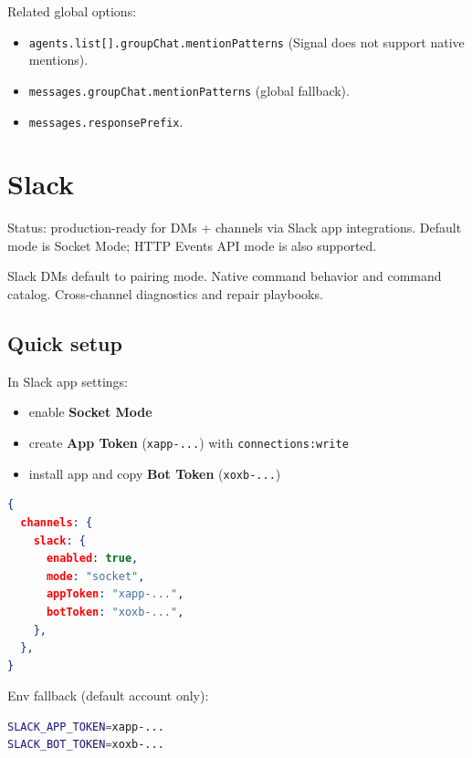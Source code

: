 Related global options:

\begin{itemize}
  \item \texttt{agents.list[].groupChat.mentionPatterns} (Signal does not support native mentions).
  \item \texttt{messages.groupChat.mentionPatterns} (global fallback).
  \item \texttt{messages.responsePrefix}.
\end{itemize}



\clearpage

\section{Slack}


Status: production-ready for DMs + channels via Slack app integrations. Default mode is Socket Mode; HTTP Events API mode is also supported.

Slack DMs default to pairing mode.
Native command behavior and command catalog.
Cross-channel diagnostics and repair playbooks.

\subsection{Quick setup}


In Slack app settings:

\begin{itemize}
  \item enable \textbf{Socket Mode}
  \item create \textbf{App Token} (\texttt{xapp-...}) with \texttt{connections:write}
  \item install app and copy \textbf{Bot Token} (\texttt{xoxb-...})
\end{itemize}



\begin{lstlisting}[language=json]
{
  channels: {
    slack: {
      enabled: true,
      mode: "socket",
      appToken: "xapp-...",
      botToken: "xoxb-...",
    },
  },
}
\end{lstlisting}


Env fallback (default account only):

\begin{lstlisting}[language=bash]
SLACK_APP_TOKEN=xapp-...
SLACK_BOT_TOKEN=xoxb-...
\end{lstlisting}



